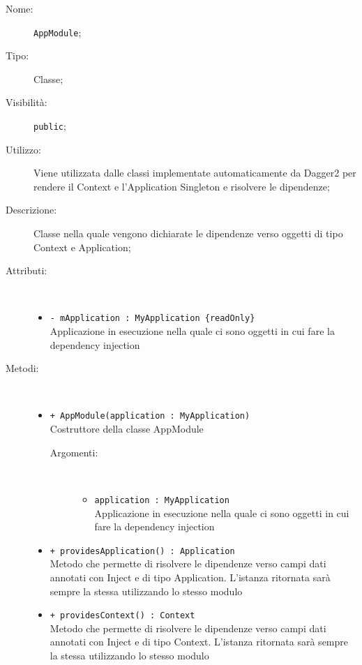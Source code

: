 \documentclass[../DefinizioneDiProdotto.tex]{subfiles}
\begin{document}
\begin{description}
	\item[Nome:] \texttt{AppModule};
	\item[Tipo:] Classe;
	\item[Visibilità:] \texttt{public};
	\item[Utilizzo:] Viene utilizzata dalle classi implementate automaticamente da Dagger2 per rendere il Context e l'Application Singleton e risolvere le dipendenze;
	\item[Descrizione:] Classe nella quale vengono dichiarate le dipendenze verso oggetti di tipo Context e Application;
	\item[Attributi:] \
	\begin{itemize}
		\item \texttt{- mApplication : MyApplication \{readOnly\}}\\
		Applicazione in esecuzione nella quale ci sono oggetti in cui fare la dependency injection
		
	\end{itemize}
	\item[Metodi:] \
	\begin{itemize}
		\item \texttt{+ AppModule(application : MyApplication)}\\
		Costruttore della classe AppModule
		\begin{description}
			\item[Argomenti:] \
			\begin{itemize}
				\item \texttt{application : MyApplication}\\
				Applicazione in esecuzione nella quale ci sono oggetti in cui fare la dependency injection\end{itemize}
		\end{description}
		\item \texttt{+ providesApplication() : Application}\\
		Metodo che permette di risolvere le dipendenze verso campi dati annotati con Inject e di tipo Application. L'istanza ritornata sarà sempre la stessa utilizzando lo stesso modulo
		\item \texttt{+ providesContext() : Context}\\
		Metodo che permette di risolvere le dipendenze verso campi dati annotati con Inject e di tipo Context. L'istanza ritornata sarà sempre la stessa utilizzando lo stesso modulo
	\end{itemize}
\end{description}
\end{document}
